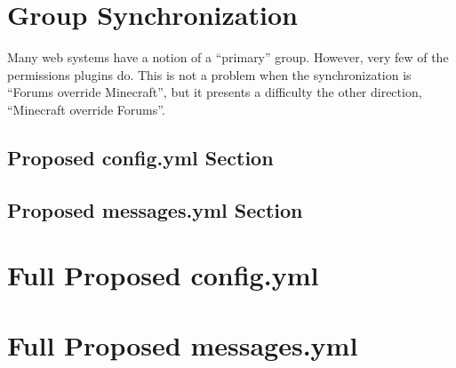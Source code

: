 \documentclass[letterpaper,12pt]{article}
\begin{document}
  \section{Group Synchronization}
Many web systems have a notion of a ``primary'' group. However, very few of the
permissions plugins do. This is not a problem when the synchronization is
``Forums override Minecraft'', but it presents a difficulty the other direction,
``Minecraft override Forums''.

	\clearpage
  \subsection{Proposed config.yml Section}
  
  
  \clearpage
  \subsection{Proposed messages.yml Section}
  

  \clearpage
  \appendix
  \section{Full Proposed config.yml}
  
  
  
  

  \clearpage
  \section{Full Proposed messages.yml}
  
  
\end{document}
